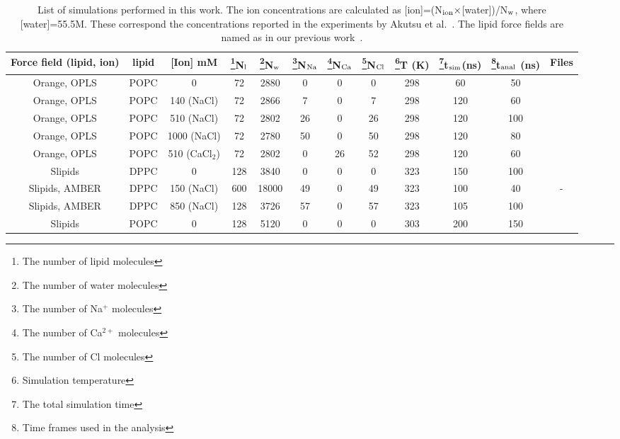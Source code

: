 \documentclass[twoside,twocolumn,9pt]{article}
\begin{document}
\begin{table}
\centering
\caption{List of simulations performed in this work. The ion concentrations are calculated as 
   [ion]=(N$_{\rm ion} \times$[water])/N$_{\rm w}$, where [water]=55.5M. 
   These correspond the concentrations reported in the experiments by Akutsu et al.~\cite{akutsu81}.
   The lipid force fields are named as in our previous work~\cite{botan15}.}\label{IONsystems2}
\begin{tabular}{c c c c c c c c c c c c}
  Force field (lipid, ion)& lipid & [Ion] mM & \footnote{The number of lipid molecules}N$_{\rm l}$   &  \footnote{The number of water molecules}N$_{\rm w}$   & \footnote{The number of Na$^+$ molecules}N$_{\rm Na}$  & \footnote{The number of Ca$^{2+}$ molecules}N$_{\rm Ca}$   &  \footnote{The number of Cl molecules}N$_{\rm Cl}$ & \footnote{Simulation temperature}T (K)  & \footnote{The total simulation time}t$_{{\rm sim}}$(ns) & \footnote{Time frames used in the analysis}t$_{{\rm anal}}$ (ns) & Files\\
  \hline
  Orange, OPLS\cite{aqvist90}  &   POPC & 0 & 72 & 2880 & 0 & 0  & 0 & 298 & 60 & 50 & \cite{orangePOPCfiles}  \\
  Orange, OPLS\cite{aqvist90} &   POPC & 140 (NaCl) & 72 & 2866 & 7 & 0  & 7 & 298 & 120 & 60 &\cite{orangePOPC140mMNaClfiles}  \\
  Orange, OPLS\cite{aqvist90}  &   POPC & 510 (NaCl) & 72 & 2802 & 26 & 0  & 26 & 298 & 120 & 100 &\cite{orangePOPC510mMNaClfiles}   \\
  Orange, OPLS\cite{aqvist90}  &   POPC & 1000 (NaCl) & 72 & 2780 & 50 & 0  & 50 & 298 & 120 & 80 & \cite{orangePOPC1000mMNaClfiles} \\
  Orange, OPLS &   POPC & 510 (CaCl$_2$)  & 72 & 2802 & 0 & 26  & 52 & 298 & 120 & 60 & \cite{orangePOPC510mMCaClfiles}  \\
  \hline
  Slipids\cite{jambeck12}   &   DPPC & 0 & 128 &3840 & 0 & 0  & 0 & 323 & 150 & 100 &~\cite{slipidsFILES}  \\
  Slipids\cite{jambeck12}, AMBER\cite{beglov94,roux96} &   DPPC & 150 (NaCl)  & 600 & 18000 & 49 & 0  &  49 & 323 & 100 & 40 &-  \\
  Slipids\cite{jambeck12}, AMBER\cite{beglov94,roux96} &   DPPC & 850 (NaCl)  & 128 & 3726 &  57 & 0  &  57 & 323 & 105 & 100 & \cite{slipidsFILESdppc}  \\
  \hline
  Slipids\cite{jambeck12b}   &   POPC & 0 & 128 & 5120 & 0 & 0  & 0 & 303 & 200 & 150 &~\cite{slipidsFILESpopc}  \\

\end{tabular}
\end{table}
\end{document}
